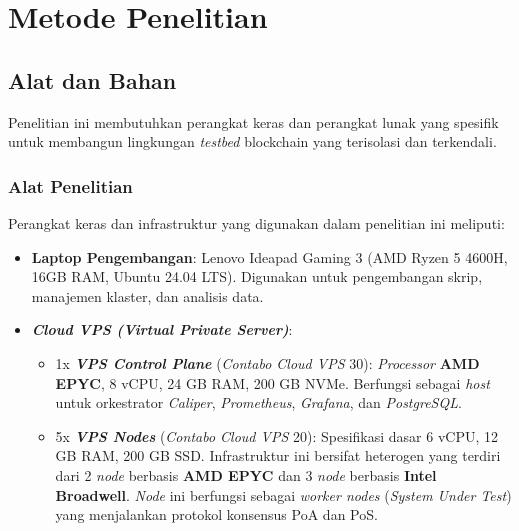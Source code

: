 \chapter{Metode Penelitian}

\section{Alat dan Bahan}

Penelitian ini membutuhkan perangkat keras dan perangkat lunak yang spesifik untuk membangun lingkungan \textit{testbed} blockchain yang terisolasi dan terkendali.

\subsection{Alat Penelitian}
Perangkat keras dan infrastruktur yang digunakan dalam penelitian ini meliputi:
\begin{itemize}
    \item \textbf{Laptop Pengembangan}: Lenovo Ideapad Gaming 3 (AMD Ryzen 5 4600H, 16GB RAM, Ubuntu 24.04 LTS). Digunakan untuk pengembangan skrip, manajemen klaster, dan analisis data.
    \item \textbf{\textit{Cloud VPS (Virtual Private Server)}}:
    \begin{itemize}
        \item 1x \textbf{\textit{VPS Control Plane}} (\textit{Contabo Cloud VPS} 30): \textit{Processor} \textbf{AMD EPYC}, 8 vCPU, 24 GB RAM, 200 GB NVMe. Berfungsi sebagai \textit{host} untuk orkestrator \textit{Caliper}, \textit{Prometheus}, \textit{Grafana}, dan \textit{PostgreSQL}.
        \item 5x \textbf{\textit{VPS Nodes}} (\textit{Contabo Cloud VPS} 20): Spesifikasi dasar 6 vCPU, 12 GB RAM, 200 GB SSD. Infrastruktur ini bersifat heterogen yang terdiri dari 2 \textit{node} berbasis \textbf{AMD EPYC} dan 3 \textit{node} berbasis \textbf{Intel Broadwell}. \textit{Node} ini berfungsi sebagai \textit{worker nodes} (\textit{System Under Test}) yang menjalankan protokol konsensus PoA dan PoS.
    \end{itemize}
\end{itemize}

